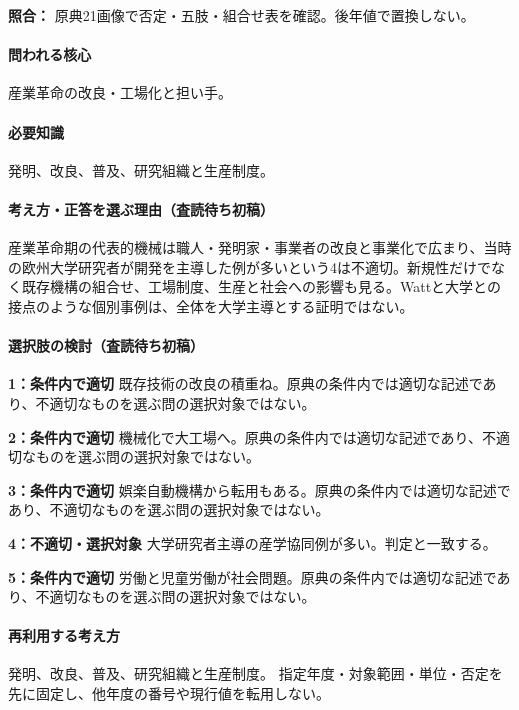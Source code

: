 \noindent\textbf{照合：} 原典21画像で否定・五肢・組合せ表を確認。後年値で置換しない。\par

\paragraph{問われる核心} 産業革命の改良・工場化と担い手。

\paragraph{必要知識} 発明、改良、普及、研究組織と生産制度。

\paragraph{考え方・正答を選ぶ理由（査読待ち初稿）} 産業革命期の代表的機械は職人・発明家・事業者の改良と事業化で広まり、当時の欧州大学研究者が開発を主導した例が多いという4は不適切。新規性だけでなく既存機構の組合せ、工場制度、生産と社会への影響も見る。Wattと大学との接点のような個別事例は、全体を大学主導とする証明ではない。

\paragraph{選択肢の検討（査読待ち初稿）}\mbox{}\par

\noindent\textbf{1：条件内で適切} 既存技術の改良の積重ね。原典の条件内では適切な記述であり、不適切なものを選ぶ問の選択対象ではない。\par

\noindent\textbf{2：条件内で適切} 機械化で大工場へ。原典の条件内では適切な記述であり、不適切なものを選ぶ問の選択対象ではない。\par

\noindent\textbf{3：条件内で適切} 娯楽自動機構から転用もある。原典の条件内では適切な記述であり、不適切なものを選ぶ問の選択対象ではない。\par

\noindent\textbf{4：不適切・選択対象} 大学研究者主導の産学協同例が多い。判定と一致する。\par

\noindent\textbf{5：条件内で適切} 労働と児童労働が社会問題。原典の条件内では適切な記述であり、不適切なものを選ぶ問の選択対象ではない。\par

\paragraph{再利用する考え方} 発明、改良、普及、研究組織と生産制度。 指定年度・対象範囲・単位・否定を先に固定し、他年度の番号や現行値を転用しない。

